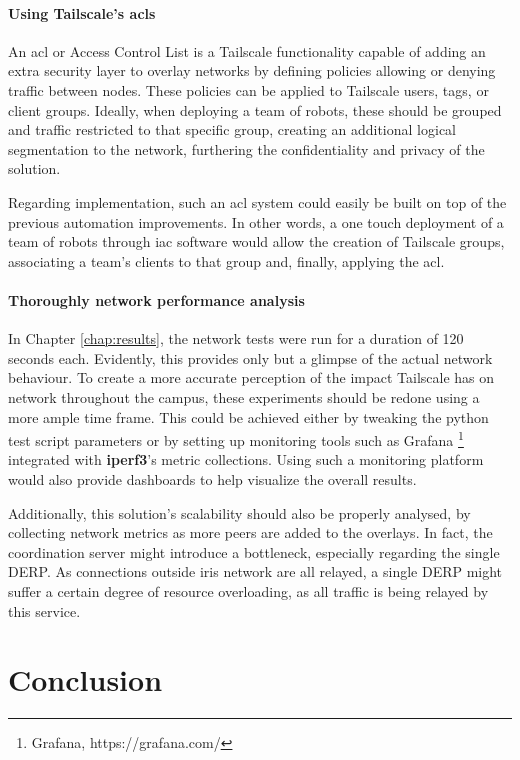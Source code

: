 \documentclass[11pt,twoside,a4paper]{report}
\begin{document}
\subsubsection{Using Tailscale's \acp{acl}}

An \ac{acl} or Access Control List is a Tailscale functionality capable of adding an extra security layer to overlay networks by defining policies allowing or denying traffic between nodes. These policies can be applied to Tailscale users, tags, or client groups. Ideally, when deploying a team of robots, these should be grouped and traffic restricted to that specific group, creating an additional logical segmentation to the network, furthering the confidentiality and privacy of the solution.

Regarding implementation, such an \ac{acl} system could easily be built on top of the previous automation improvements. In other words, a one touch deployment of a team of robots through \ac{iac} software would allow the creation of Tailscale groups, associating a team's clients to that group and, finally, applying the \ac{acl}.

\subsubsection{Thoroughly network performance analysis}

In Chapter \ref{chap:results}, the network tests were run for a duration of 120 seconds each. Evidently, this provides only but a glimpse of the actual network behaviour. To create a more accurate perception of the impact Tailscale has on network throughout the campus, these experiments should be redone using a more ample time frame. This could be achieved either by tweaking the python test script parameters or by setting up monitoring tools such as Grafana \footnote{Grafana, https://grafana.com/} integrated with \textbf{iperf3}'s metric collections. Using such a monitoring platform would also provide dashboards to help visualize the overall results.

Additionally, this solution's scalability should also be properly analysed, by collecting network metrics as more peers are added to the overlays. In fact, the coordination server might introduce a bottleneck, especially regarding the single \ac{DERP}. As connections outside \ac{iris} network are all relayed, a single \ac{DERP} might suffer a certain degree of resource overloading, as all traffic is being relayed by this service.

\chapter{Conclusion}
\end{document}

